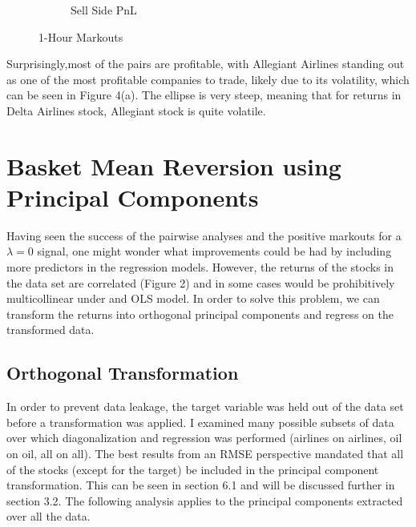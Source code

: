 \documentclass{article}
\begin{document}
\begin{figure}[h!]
\begin{subfigure}{.5\textwidth}
    \caption{Sell Side PnL}
  \end{subfigure}
  \caption{1-Hour Markouts}
\end{figure}
Surprisingly,most of the pairs are profitable, with Allegiant Airlines standing out 
as one of the most profitable companies to trade, likely due to its volatility, which
can be seen in Figure 4(a). The ellipse is very steep, meaning that for
returns in Delta Airlines stock, Allegiant stock is quite volatile.

\section{Basket Mean Reversion using Principal Components}
Having seen the success of the pairwise analyses and the positive markouts for 
a $\lambda=0$ signal, one might wonder what improvements could be had by including
more predictors in the regression models. However, the returns of the stocks in the 
data set are correlated (Figure 2) and in some cases would be prohibitively multicollinear under
and OLS model. In order to solve this problem, we can transform the returns into
orthogonal principal components and regress on the transformed data. 

\subsection{Orthogonal Transformation}
In order to prevent data leakage, the target variable was held out of the data set before 
a transformation was applied. I examined many possible subsets of data over which 
diagonalization and regression was performed (airlines on airlines, oil on oil, all on all).
The best results from an RMSE perspective mandated that all of the stocks (except for the 
target) be included in the principal component transformation. This can be seen in section
6.1 and will be discussed further in section 3.2. The following analysis applies
to the principal components extracted over all the data. 
\end{document}
